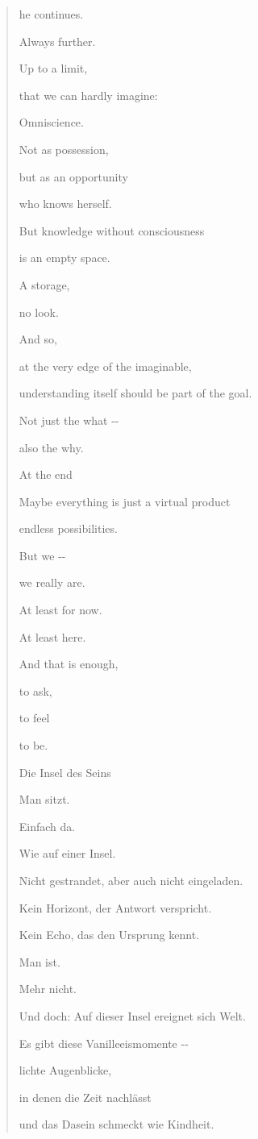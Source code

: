 \documentclass[
  ngerman,
]{article}
\begin{document}
\begin{quote}
he continues.

Always further.

Up to a limit,

that we can hardly imagine:

Omniscience.

Not as possession,

but as an opportunity

who knows herself.

But knowledge without consciousness

is an empty space.

A storage,

no look.

And so,

at the very edge of the imaginable,

understanding itself should be part of the goal.

Not just the what -\/-

also the why.

At the end

Maybe everything is just a virtual product

endless possibilities.

But we -\/-

we really are.

At least for now.

At least here.

And that is enough,

to ask,

to feel

to be.

Die Insel des Seins

Man sitzt.

Einfach da.

Wie auf einer Insel.

Nicht gestrandet, aber auch nicht eingeladen.

Kein Horizont, der Antwort verspricht.

Kein Echo, das den Ursprung kennt.

Man ist.

Mehr nicht.

Und doch: Auf dieser Insel ereignet sich Welt.

Es gibt diese Vanilleeismomente -\/-

lichte Augenblicke,

in denen die Zeit nachlässt

und das Dasein schmeckt wie Kindheit.


\end{quote}
\end{document}
